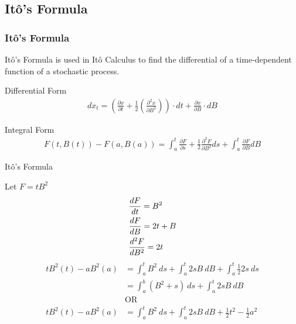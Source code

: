 
\subsection{It\^o's Formula}

\begin{frame}
\frametitle{It\^o's Formula}
It\^o's Formula is used in It\^o Calculus to find the differential of a time-dependent function of a stochastic process.
\vfill

		 \begin{block}{Differential Form}
      \begin{align*}
				\displaystyle dx_t =\left(\frac{\partial x}{\partial t} + \frac{1}{2} \left(\frac{\partial ^2 x}{\partial B ^2}\right)\right) \cdot  dt + \frac{\partial x}{\partial B} \cdot dB 
			\end{align*}
    \end{block}
		
\vfill

		\begin{block}{Integral Form}
      \begin{align*}
				\displaystyle F(t, B(t))-F(a,B(a))=
 \int_{a}^{t} \frac{\partial F}{\partial s} + \frac{1}{2} \frac{\partial^2 F}{\partial B^2}ds+
 \int_a^t \frac{\partial F}{\partial B} dB
			\end{align*}
    \end{block}

\vfill
\end{frame}

\begin{frame}{It\^o's Formula} 

Let $F=tB^2$ 
\begin{align*}
\displaystyle
&\frac{dF}{dt}= B^2\\
&\frac{dF}{dB}=2t+B\\ 
&\frac{d^2 F}{dB^2}=2t
\end{align*}
\begin{align*}
tB^2(t)-aB^2(a) &=\int_{a}^{t}B^2 ~ ds+ \int_{a}^{t}2sB ~ dB+\int_a^t \frac{1}{2}2s ~ ds\\
 &=\int_a^b \left(B^2+s \right) ~ ds+\int_a^t 2sB ~ dB\\
 &\text{OR}\\
tB^2(t)-aB^2(a) &= \int_a^t B^2 ~ ds+ \int_a^t 2sB ~ dB+ \frac{1}{2} t^2- \frac{1}{2}a^2
\end{align*}
\end{frame}

